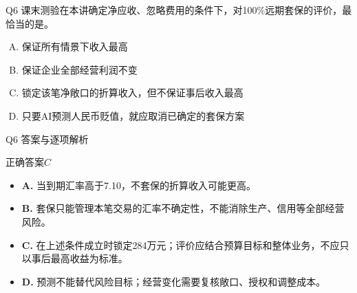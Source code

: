 \documentclass[aspectratio=169,compress,11pt]{beamer}
\newcommand{\currentweeklabel}{导入}
\begin{document}
\renewcommand{\currentweeklabel}{归纳}\begin{frame}[t]{Q6 课末测验}\relax\hypertarget{slide13}{}\fontsize{10.5}{12.8}\selectfont\setlength{\abovedisplayskip}{.25em}\setlength{\belowdisplayskip}{.25em}在本讲确定净应收、忽略费用的条件下，对100\%远期套保的评价，最恰当的是。\par\vspace{.7em}\begin{enumerate}[A.]\setlength{\itemsep}{.7em}\item 保证所有情景下收入最高\item 保证企业全部经营利润不变\item 锁定该笔净敞口的折算收入，但不保证事后收入最高\item 只要AI预测人民币贬值，就应取消已确定的套保方案\end{enumerate}\end{frame}
\renewcommand{\currentweeklabel}{归纳}\begin{frame}[t]{Q6 答案与逐项解析}\relax\hypertarget{slide14}{}\fontsize{10.5}{12.8}\selectfont\setlength{\abovedisplayskip}{.25em}\setlength{\belowdisplayskip}{.25em}\begin{exampleblock}{正确答案}\(C\)\end{exampleblock}\begin{itemize}\setlength{\itemsep}{.4em}\item \textbf{A. }当到期汇率高于7.10，不套保的折算收入可能更高。\item \textbf{B. }套保只能管理本笔交易的汇率不确定性，不能消除生产、信用等全部经营风险。\item \textbf{C. }在上述条件成立时锁定284万元；评价应结合预算目标和整体业务，不应只以事后最高收益为标准。\item \textbf{D. }预测不能替代风险目标；经营变化需要复核敞口、授权和调整成本。\end{itemize}\end{frame}
\end{document}
